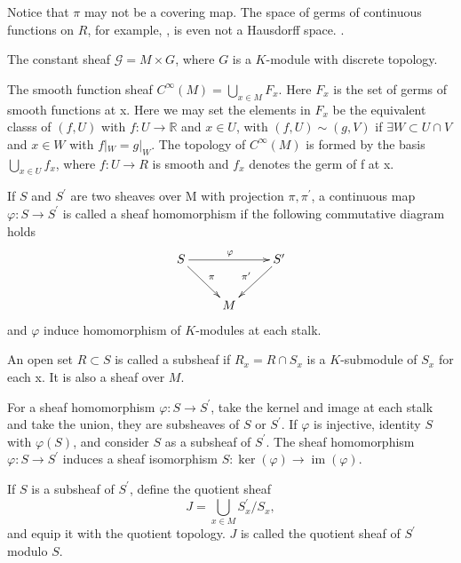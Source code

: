 \documentclass[twoside]{article}
\begin{document}
 Notice that $\pi$ may not be  a covering map. The space of germs of continuous functions on $R$, for example, , is even  not  a Hausdorff space.  .


\begin{example}
  The constant sheaf $\mathcal{G}=M\times G$, where $G$  is a $K$-module with discrete topology.
\end{example}
\begin{example}
  The smooth function sheaf $C^\infty(M)=\bigcup_{x\in M}F_x$. Here  $F_x$ is the set of germs of smooth functions at x. Here we may set the elements in $F_x$ be the equivalent  classs of $(f,U)$ with $f:U\to \mathbb{R}$ and $x\in U$, with $(f,U)\sim (g,V)$ if $\exists W\subset U\cap V$ and $x\in W$ with $f|_W=g|_W$. The topology of $C^\infty(M)$ is formed by the basis  $\bigcup_{x\in U}f_x$,    where $f:U\to R$ is smooth and $f_x $ denotes the germ of f at x.
\end{example}
\begin{definition}
If $S$ and $S^\prime $ are two sheaves over M with projection $\pi,\pi^\prime$, a continuous map $\varphi\colon S\to S^\prime$ is called a sheaf homomorphism if  the following commutative diagram holds
\begin{equation*}
  \xymatrix{
  S\ar[dr]^{\pi} \ar[rr]^{\varphi} & & S^\prime \ar[dl]_{\pi^\prime}\\
  & M & \\
  }
\end{equation*}
and $\varphi$ induce homomorphism of $K$-modules at each stalk.
\end{definition}

\begin{definition}An open set $R\subset S$ is called a subsheaf if $R_x=R\cap S_x$ is a $K$-submodule  of $S_x$ for each x. It is also a sheaf over $M$.
\end{definition}

For a sheaf homomorphism $\varphi\colon S\to S^\prime$,  take the kernel and image at each stalk and take the union, they are  subsheaves of $S$ or $S^\prime$. If $\varphi$ is injective, identity $S$ with $\varphi(S)$, and consider $S$ as a subsheaf of $S^\prime$. The sheaf homomorphism $\varphi\colon S\to S^\prime$ induces a sheaf isomorphism $S\colon \ker(\varphi)\to \operatorname{im}(\varphi)$.

If $S$ is a subsheaf of $S^\prime$, define the quotient sheaf $$
J=\bigcup_{x\in M} S^\prime_x/S_x,
$$
and equip it with the quotient topology. $J$ is called the quotient sheaf of $S^\prime $ modulo $S$.
\end{document}
